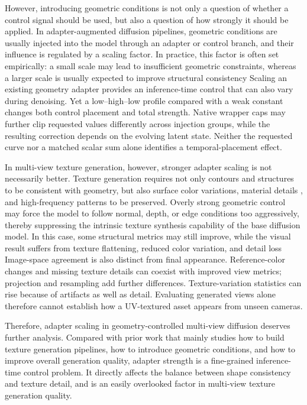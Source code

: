 \documentclass[times,twocolumn,final]{elsarticle}
\providecommand{\DIFadd}[1]{{\protect\color{blue} \sf #1}} %
\providecommand{\DIFdel}[1]{{\protect\color{red} \scriptsize #1}} %
\providecommand{\DIFaddbegin}{} %
\providecommand{\DIFaddend}{} %
\providecommand{\DIFdelbegin}{} %
\providecommand{\DIFdelend}{} %
\begin{document}
\DIFdelbegin \DIFdel{However, introducing geometric conditions is not only a question of whether a control signal should be used, but also a question of how strongly it should be applied. In adapter-augmented diffusion pipelines, geometric conditions are usually injected into the model through an adapter or control branch, and their influence is regulated by a scaling factor. In practice, this factor is often set empirically: a small scale may lead to insufficient geometric constraints, whereas a larger scale is usually expected to improve structural consistency}\DIFdelend \DIFaddbegin \DIFadd{Scaling an existing geometry adapter provides an inference-time control that can also vary during denoising. Yet a low--high--low profile compared with a weak constant changes both control placement and total strength. Native wrapper caps may further clip requested values differently across injection groups, while the resulting correction depends on the evolving latent state. Neither the requested curve nor a matched scalar sum alone identifies a temporal-placement effect}\DIFaddend .

\DIFdelbegin \DIFdel{In multi-view texture generation, however, stronger adapter scaling is not necessarily better. Texture generation requires not only contours and structures to be consistent with geometry, but also surface color variations, material details , and high-frequency patterns to be preserved. Overly strong geometric control may force the model to follow normal, depth, or edge conditions too aggressively, thereby suppressing the intrinsic texture synthesis capability of the base diffusion model. In this case, some structural metrics may still improve, while the visual result suffers from texture flattening, reduced color variation, and detail loss}\DIFdelend \DIFaddbegin \DIFadd{Image-space agreement is also distinct from final appearance. Reference-color changes and missing texture details can coexist with improved view metrics; projection and resampling add further differences. Texture-variation statistics can rise because of artifacts as well as detail. Evaluating generated views alone therefore cannot establish how a UV-textured asset appears from unseen cameras}\DIFaddend .

\DIFdelbegin \DIFdel{Therefore, adapter scaling in geometry-controlled multi-view diffusion deserves further analysis. Compared with prior work that mainly studies how to build texture generation pipelines, how to introduce geometric conditions, and how to improve overall generation quality, adapter strength is a fine-grained inference-time control problem. It directly affects the balance between shape consistency and texture detail, and is an easily overlooked factor in multi-view texture generation quality.
}%
\end{document}
